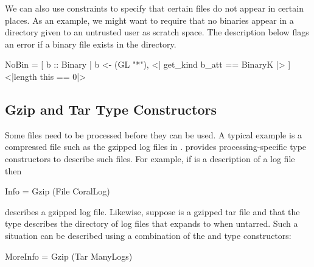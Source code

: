 We can also use constraints to specify that certain files do not appear
in certain places.  As an example, we might want to require that no
binaries appear in a directory given to an untrusted user as scratch
space. The description below flags an error if a binary file exists
in the directory. 
\begin{code}
 NoBin =
  [ b :: Binary | b <-  (GL "*"), 
                  <| get_kind b_att == BinaryK |> ]
   <|length this == 0|>
\end{code}



\subsection{Gzip and Tar Type Constructors}
\label{sec:file-modifiers}

Some files need to be processed before they can be used.  A typical
example is a compressed file such as the gzipped log files in 
\coral{}.  \forest{} provides processing-specific type
constructors to describe such files.   For example, if
 is a \padshaskell{} 
description of a \coral{} log file then 
\begin{code}
 Info = Gzip (File CoralLog)
\end{code}
describes a gzipped log file.
Likewise, suppose  is a gzipped tar file and that the type
 describes the directory of log files that  expands
to when untarred.  Such a situation can be described using a
combination of the  and  type constructors:
\begin{code}
 MoreInfo = Gzip (Tar ManyLogs)
\end{code}


